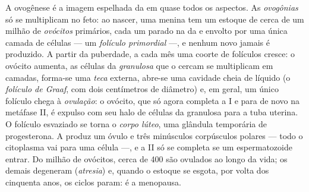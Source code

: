 \begin{definition}\label{def:b2:mammal-reproduction:ovary}
A ovogênese é a imagem espelhada da  em quase todos os
aspectos. As \emph{ovogônias} só se multiplicam no feto: ao nascer, uma
menina tem um estoque de cerca de um milhão de \emph{ovócitos}
primários, cada um parado na  da  e envolto por uma
única camada de células --- um \emph{folículo primordial} ---, e nenhum
novo jamais é produzido. A partir da puberdade, a cada mês uma coorte
de folículos cresce: o ovócito aumenta, as células da
\emph{granulosa} que o cercam se multiplicam em camadas, forma-se uma
\emph{teca} externa, abre-se uma cavidade cheia de líquido (o
\emph{folículo de Graaf}, com dois centímetros de diâmetro) e, em
geral, um único folículo chega à \emph{ovulação}: o ovócito, que só
agora completa a  I e para de novo na metáfase II, é expulso com
seu halo de células da granulosa para a tuba uterina. O folículo
esvaziado se torna o \emph{corpo lúteo}, uma glândula temporária de
progesterona. A  produz um óvulo e três minúsculos corpúsculos
polares --- todo o citoplasma vai para uma célula ---, e a  II só
se completa se um espermatozoide entrar. Do milhão de ovócitos, cerca
de \num{400} são ovulados ao longo da vida; os demais degeneram
(\emph{atresia}) e, quando o estoque se esgota, por volta dos cinquenta
anos, os ciclos param: é a menopausa.
\end{definition}

